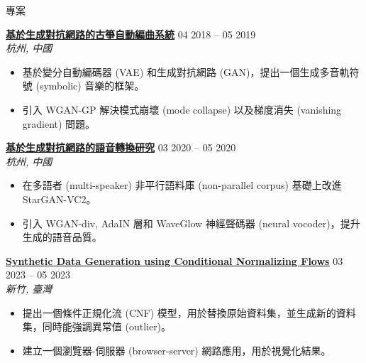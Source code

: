 \documentclass{resume}
\begin{document}
\vspace{-1em}
\begin{rSection}{專案}
\vspace{-1.25em}
    \item \textbf{\href{https://docs.google.com/presentation/d/1797idRRmgeD2JnUslGbflmGUO2X5lMY6/edit?usp=drive_link&ouid=101248488395326982475&rtpof=true&sd=true}{\textbf{\large{\underline{基於生成對抗網路的古箏自動編曲系統}}}}} \hfill {04 2018 -- 05 2019}\\
    \mbox{} \hfill \textit{杭州, 中國}
    \vspace{-0.5em}
    \begin{itemize}
        \item 基於變分自動編碼器 (VAE) 和生成對抗網路 (GAN)，提出一個生成多音軌符號 (symbolic) 音樂的框架。
        \item 引入 WGAN-GP 解決模式崩壞 (mode collapse) 以及梯度消失 (vanishing gradient) 問題。
    \end{itemize}

    \item \textbf{\href{https://drive.google.com/file/d/1736XHtaeT58FL_gbOa9XjlyA6xAXDkg2/view?usp=drive_link}{\textbf{\large{\underline{基於生成對抗網路的語音轉換研究}}}}} \hfill {03 2020 -- 05 2020}\\
    \mbox{} \hfill \textit{杭州, 中國}
    \vspace{-0.5em}
    \begin{itemize}
        \item 在多語者 (multi-speaker) 非平行語料庫 (non-parallel corpus) 基礎上改進 StarGAN-VC2。
        \item 引入 WGAN-div, AdaIN 層和 WaveGlow 神經聲碼器 (neural vocoder)，提升生成的語音品質。
    \end{itemize}
    
    \item \textbf{\href{https://drive.google.com/file/d/176xCWH6j0VAuoXLtB_HppxyZN-6ezq9_/view?usp=drive_link}{\textbf{\large{\underline{Synthetic Data Generation using Conditional Normalizing Flows}}}}} \hfill {03 2023 -- 05 2023}\\
    \mbox{} \hfill \textit{新竹, 臺灣}
    \vspace{-0.5em}
    \begin{itemize}
        \item 提出一個條件正規化流 (CNF) 模型，用於替換原始資料集，並生成新的資料集，同時能強調異常值 (outlier)。
        \item 建立一個瀏覽器-伺服器 (browser-server) 網路應用，用於視覺化結果。
    \end{itemize}


\end{rSection}
\end{document}
